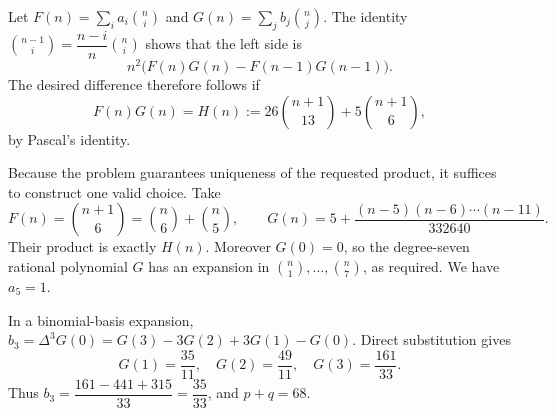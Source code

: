 Let $F(n)=\sum_i a_i\binom ni$ and $G(n)=\sum_j b_j\binom nj$. The identity $\binom{n-1}{i}=\dfrac{n-i}{n}\binom ni$ shows that the left side is
\[n^2\bigl(F(n)G(n)-F(n-1)G(n-1)\bigr).\]
The desired difference therefore follows if
\[F(n)G(n)=H(n):=26\binom{n+1}{13}+5\binom{n+1}{6},\]
by Pascal's identity.

Because the problem guarantees uniqueness of the requested product, it suffices to construct one valid choice. Take
\[F(n)=\binom{n+1}{6}=\binom n6+\binom n5,\qquad
G(n)=5+\dfrac{(n-5)(n-6)\cdots(n-11)}{332640}.\]
Their product is exactly $H(n)$. Moreover $G(0)=0$, so the degree-seven rational polynomial $G$ has an expansion in $\binom n1,\ldots,\binom n7$, as required. We have $a_5=1$.

In a binomial-basis expansion, $b_3=\Delta^3G(0)=G(3)-3G(2)+3G(1)-G(0)$. Direct substitution gives
\[G(1)=\dfrac{35}{11},\quad G(2)=\dfrac{49}{11},\quad G(3)=\dfrac{161}{33}.\]
Thus $b_3=\dfrac{161-441+315}{33}=\dfrac{35}{33}$, and $p+q=\boxed{68}$.
